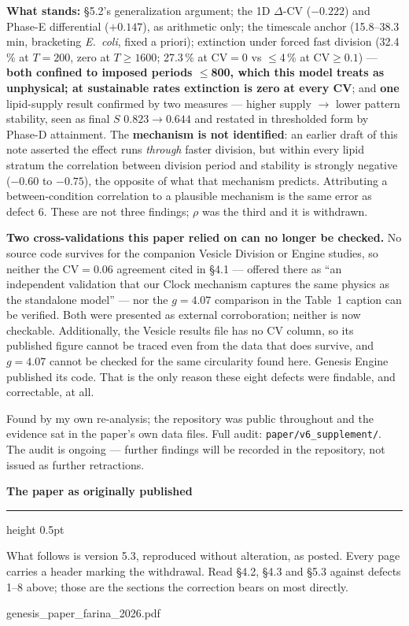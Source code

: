\documentclass[11pt,letterpaper]{article}
\begin{document}
\textbf{What stands:} \S5.2's generalization argument; the 1D
$\Delta$-CV ($-0.222$) and Phase-E differential ($+0.147$), as
arithmetic only; the timescale anchor (15.8--38.3 min, bracketing
\emph{E.\ coli}, fixed a priori); extinction under forced fast division
(32.4\,\% at $T = 200$, zero at $T \geq 1600$; 27.3\,\% at
$\mathrm{CV} = 0$ vs $\leq$4\,\% at $\mathrm{CV} \geq 0.1$) ---
\textbf{both confined to imposed periods $\leq$800, which this model
treats as unphysical; at sustainable rates extinction is zero at every
CV}; and \textbf{one} lipid-supply result confirmed by two measures ---
higher supply $\rightarrow$ lower pattern stability, seen as final $S$
$0.823 \rightarrow 0.644$ and restated in thresholded form by Phase-D
attainment. The \textbf{mechanism is not identified}: an earlier draft
of this note asserted the effect runs \emph{through} faster division,
but within every lipid stratum the correlation between division period
and stability is strongly negative ($-0.60$ to $-0.75$), the opposite of
what that mechanism predicts. Attributing a between-condition
correlation to a plausible mechanism is the same error as defect 6.
These are not three findings; $\rho$ was the third and it is withdrawn.

\textbf{Two cross-validations this paper relied on can no longer be
checked.} No source code survives for the companion Vesicle Division or
Engine studies, so neither the $\mathrm{CV} = 0.06$ agreement cited in
\S4.1 --- offered there as ``an independent validation that our Clock
mechanism captures the same physics as the standalone model'' --- nor
the $g = 4.07$ comparison in the Table~1 caption can be verified. Both
were presented as external corroboration; neither is now checkable.
Additionally, the Vesicle results file has no CV column, so its
published figure cannot be traced even from the data that does survive,
and $g = 4.07$ cannot be checked for the same circularity found here. Genesis Engine published its code. That is the only reason these
eight defects were findable, and correctable, at all.

Found by my own re-analysis; the repository was public throughout and
the evidence sat in the paper's own data files. Full audit:
\texttt{paper/v6\_supplement/}. The audit is ongoing --- further
findings will be recorded in the repository, not issued as further
retractions.

\clearpage

{\large\bfseries The paper as originally published}

\vspace{4pt}
{\color{rule}\hrule height 0.5pt}
\vspace{8pt}

What follows is version 5.3, reproduced without alteration, as posted.
Every page carries a header marking the withdrawal. Read \S4.2, \S4.3
and \S5.3 against defects 1--8 above; those are the sections the
correction bears on most directly.

\clearpage
{}

           {genesis_paper_farina_2026.pdf}
\end{document}
